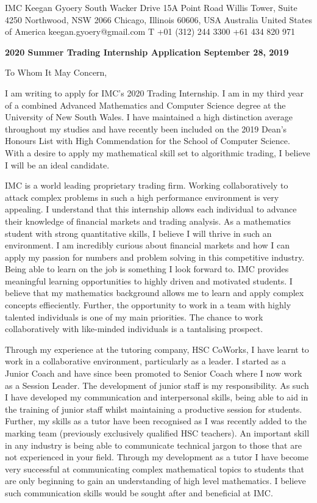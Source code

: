 \documentclass[a4paper,11pt]{article}
\begin{document}
IMC \hfill Keegan Gyoery  South Wacker Drive \hfill 15A Point Road \break
Willis Tower, Suite 4250 \hfill Northwood, NSW 2066 \break
Chicago, Illinois 60606, USA \hfill Australia \break
United States of America \hfill keegan.gyoery@gmail.com \break
T +01 (312) 244 3300 \hfill +61 434 820 971 \break

\vspace{5mm}
\textbf{2020 Summer Trading Internship Application September 28, 2019} \par
To Whom It May Concern, \par

I am writing to apply for IMC’s 2020 Trading Internship. I am in my third year of a
combined Advanced Mathematics and Computer Science degree at the University of New South
Wales. I have maintained a high distinction average throughout my studies and have recently been
included on the 2019 Dean’s Honours List with High Commendation for the School of Computer
Science. With a desire to apply my mathematical skill set to algorithmic trading, I believe I will
be an ideal candidate.\par

IMC is a world leading proprietary trading firm. Working collaboratively to attack complex problems in such a high performance environment is very appealing. I understand that this internship allows each individual to advance their knowledge of financial markets and trading analysis. As a mathematics student with strong quantitative skills, I believe I will thrive in such an environment. I am incredibly curious about financial markets and how I can apply my passion for numbers and problem solving in this competitive industry. Being able to learn on the job is something I look forward to. IMC provides meaningful learning opportunities to highly driven and motivated students. I believe that my mathematics background allows me to learn and apply complex concepts effieciently. Further, the opportunity to work in a team with highly talented individuals is one of my main priorities. The chance to work collaboratively with like-minded individuals is a tantalising prospect.

Through my experience at the tutoring company, HSC CoWorks, I have learnt to work in a collaborative environment, particularly as a leader. I started as a Junior Coach and have since been promoted to Senior Coach where I now work as a Session Leader. The development of junior staff is my responsibility. As such I have developed my communication and interpersonal skills, being able to aid in the training of junior staff whilst maintaining a productive session for students. Further, my skills as a tutor have been recognised as I was recently added to the marking team (previously exclusively qualified HSC teachers). An important skill in any industry is being able to communicate technical jargon to those that are not experienced in your field. Through my development as a tutor I have become very successful at communicating complex mathematical topics to students that are only beginning to gain an understanding of high level mathematics. I believe such communication skills would be sought after and beneficial at IMC.\par
\end{document}

